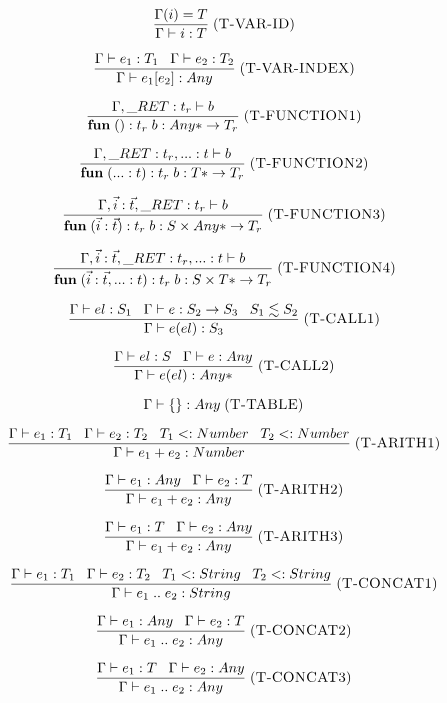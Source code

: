 \documentclass[12pt]{article}
\newcommand{\mylabel}[1]{\; (\textsc{#1})}
\newcommand{\subtype}{<:}
\newcommand{\kw}[1]{\mathbf{#1} \;}
\newcommand{\env}{\Gamma}
\newcommand{\ret}{\string_RET}
\begin{document}
\[
\frac{\env(i) = T}
     {\env \vdash i : T}
\mylabel{T-VAR-ID}
\]

\[
\frac{\env \vdash e_{1}:T_{1} \;\;\;
      \env \vdash e_{2}:T_{2}}
     {\env \vdash e_{1}[e_{2}] : Any}
\mylabel{T-VAR-INDEX}
\]

\[
\frac{\env, \ret:t_{r} \vdash b}
     {\kw{fun} ():t_{r} \; b : {Any*} \rightarrow T_{r}}
\mylabel{T-FUNCTION1}
\]

\[
\frac{\env, \ret:t_{r}, {...}:t \vdash b}
     {\kw{fun} ({...}:t):t_{r} \; b : {T*} \rightarrow T_{r}}
\mylabel{T-FUNCTION2}
\]

\[
\frac{\env, \vec{i}:\vec{t}, \ret:t_{r} \vdash b}
     {\kw{fun} (\vec{i}:\vec{t}):t_{r} \; b :
      S \times {Any*} \rightarrow T_{r}}
\mylabel{T-FUNCTION3}
\]

\[
\frac{\env, \vec{i}:\vec{t}, \ret:t_{r}, {...}:t \vdash b}
     {\kw{fun} (\vec{i}:\vec{t}, {...}:t):t_{r} \; b :
      S \times {T*} \rightarrow T_{r}}
\mylabel{T-FUNCTION4}
\]

\[
\frac{\env \vdash el:S_{1} \;\;\;
      \env \vdash e:S_{2} \rightarrow S_{3} \;\;\;
      S_{1} \lesssim S_{2}}
     {\env \vdash e(el) : S_{3}}
\mylabel{T-CALL1}
\]

\[
\frac{\env \vdash el:S \;\;\;
      \env \vdash e:Any}
     {\env \vdash e(el) : {Any*}}
\mylabel{T-CALL2}
\]

\[
\env \vdash \{\} : Any
\mylabel{T-TABLE}
\]

\[
\frac{\env \vdash e_{1}:T_{1} \;\;\;
      \env \vdash e_{2}:T_{2} \;\;\;
      T_{1} \subtype Number \;\;\;
      T_{2} \subtype Number}
     {\env \vdash e_{1} + e_{2} : Number}
\mylabel{T-ARITH1}
\]

\[
\frac{\env \vdash e_{1}:Any \;\;\;
      \env \vdash e_{2}:T}
     {\env \vdash e_{1} + e_{2} : Any}
\mylabel{T-ARITH2}
\]

\[
\frac{\env \vdash e_{1}:T \;\;\;
      \env \vdash e_{2}:Any}
     {\env \vdash e_{1} + e_{2} : Any}
\mylabel{T-ARITH3}
\]

\[
\frac{\env \vdash e_{1}:T_{1} \;\;\;
      \env \vdash e_{2}:T_{2} \;\;\;
      T_{1} \subtype String \;\;\;
      T_{2} \subtype String}
     {\env \vdash e_{1} \; {..} \;  e_{2} : String}
\mylabel{T-CONCAT1}
\]

\[
\frac{\env \vdash e_{1}:Any \;\;\;
      \env \vdash e_{2}:T}
     {\env \vdash e_{1} \; {..} \; e_{2} : Any}
\mylabel{T-CONCAT2}
\]

\[
\frac{\env \vdash e_{1}:T \;\;\;
      \env \vdash e_{2}:Any}
     {\env \vdash e_{1} \; {..} \; e_{2} : Any}
\mylabel{T-CONCAT3}
\]
\end{document}
